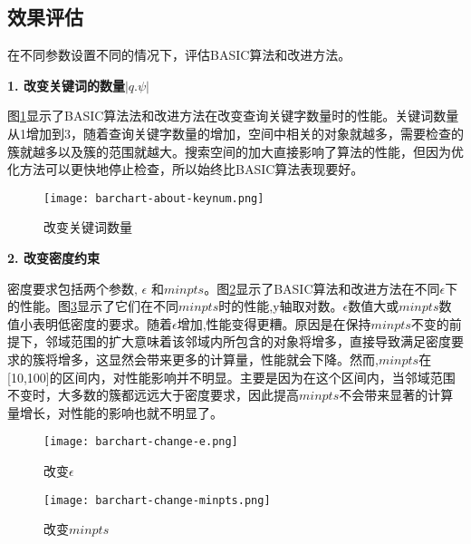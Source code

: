 \subsection{效果评估}
在不同参数设置不同的情况下，评估BASIC算法和改进方法。

\textbf{1. 改变关键词的数量$\left| q.\psi \right|$}

图\ref{change_key_num}显示了BASIC算法法和改进方法在改变查询关键字数量时的性能。关键词数量从1增加到3，随着查询关键字数量的增加，空间中相关的对象就越多，需要检查的簇就越多以及簇的范围就越大。搜索空间的加大直接影响了算法的性能，但因为优化方法可以更快地停止检查，所以始终比BASIC算法表现要好。

\begin{figure}[htbp]
  \begin{center}
    \texttt{[image: barchart-about-keynum.png]}
    \caption{改变关键词数量}
    \label{change_key_num}
  \end{center}
\end{figure}

\textbf{2. 改变密度约束}

密度要求包括两个参数, $\epsilon$ 和$minpts$。图\ref{change_epsilon}显示了BASIC算法和改进方法在不同$\epsilon$下的性能。图\ref{change_minpts}显示了它们在不同$minpts$时的性能,y轴取对数。$\epsilon$数值大或$minpts$数值小表明低密度的要求。随着$\epsilon$增加,性能变得更糟。原因是在保持$minpts$不变的前提下，邻域范围的扩大意味着该邻域内所包含的对象将增多，直接导致满足密度要求的簇将增多，这显然会带来更多的计算量，性能就会下降。然而,$minpts$在[10,100]的区间内，对性能影响并不明显。主要是因为在这个区间内，当邻域范围不变时，大多数的簇都远远大于密度要求，因此提高$minpts$不会带来显著的计算量增长，对性能的影响也就不明显了。

\begin{figure}[htbp]
  \begin{center}
    \texttt{[image: barchart-change-e.png]}
    \caption{改变$\epsilon$}
    \label{change_epsilon}
  \end{center}
\end{figure} 


\begin{figure}[htbp]
  \begin{center}
    \texttt{[image: barchart-change-minpts.png]}
    \caption{改变$minpts$}
    \label{change_minpts}
  \end{center}
\end{figure} 

